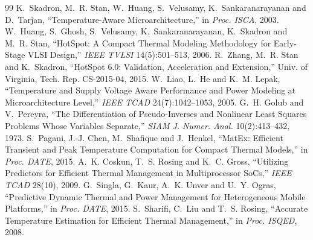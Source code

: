 \documentclass[11pt,a4paper]{article}
\begin{document}
\begin{thebibliography}{99}\small
\setlength{\itemsep}{0pt}
 K.~Skadron, M.~R. Stan, W.~Huang, S.~Velusamy, K.~Sankaranarayanan and
  D.~Tarjan, ``Temperature-Aware Microarchitecture,'' in \emph{Proc. ISCA}, 2003.
 W.~Huang, S.~Ghosh, S.~Velusamy, K.~Sankaranarayanan, K.~Skadron and
  M.~R. Stan, ``HotSpot: A Compact Thermal Modeling Methodology for Early-Stage VLSI Design,''
  \emph{IEEE TVLSI} 14(5):501--513, 2006.
 R.~Zhang, M.~R. Stan and K.~Skadron, ``HotSpot 6.0: Validation, Acceleration
  and Extension,'' Univ. of Virginia, Tech. Rep. CS-2015-04, 2015.
 W.~Liao, L.~He and K.~M. Lepak, ``Temperature and Supply Voltage Aware
  Performance and Power Modeling at Microarchitecture Level,'' \emph{IEEE TCAD} 24(7):1042--1053,
  2005.
 G.~H. Golub and V.~Pereyra, ``The Differentiation of Pseudo-Inverses and
  Nonlinear Least Squares Problems Whose Variables Separate,'' \emph{SIAM J. Numer. Anal.}
  10(2):413--432, 1973.
 S.~Pagani, J.-J. Chen, M.~Shafique and J.~Henkel, ``MatEx: Efficient Transient
  and Peak Temperature Computation for Compact Thermal Models,'' in \emph{Proc. DATE}, 2015.
 A.~K. Coskun, T.~S. Rosing and K.~C. Gross, ``Utilizing Predictors for
  Efficient Thermal Management in Multiprocessor SoCs,'' \emph{IEEE TCAD} 28(10), 2009.
 G.~Singla, G.~Kaur, A.~K. Unver and U.~Y. Ogras, ``Predictive Dynamic Thermal
  and Power Management for Heterogeneous Mobile Platforms,'' in \emph{Proc. DATE}, 2015.
 S.~Sharifi, C.~Liu and T.~S. Rosing, ``Accurate Temperature Estimation for
  Efficient Thermal Management,'' in \emph{Proc. ISQED}, 2008.
\end{thebibliography}
\end{document}
